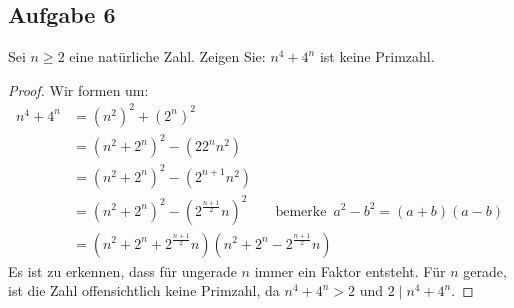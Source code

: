 \subsection{Aufgabe 6}
Sei $n \geq 2$ eine natürliche Zahl. Zeigen Sie: $n^4 + 4^n$ ist keine Primzahl.
\begin{proof}
  Wir formen um:
  \begin{equation*}
    \begin{aligned}
      n^4 + 4^n & = (n^2)^2 + (2^n)^2                                                \\
                & = (n^2 + 2^n)^2 - (22^nn^2)                                        \\
                & = (n^2 + 2^n)^2 - (2^{n+1}n^2)                                     \\
                & = (n^2 + 2^n)^2 - (2^{\frac{n+1}{2}}n)^2
      \qquad \text{bemerke} \enspace a^2 - b^2 = (a + b)(a - b)                      \\
                & = (n^2 + 2^n + 2^{\frac{n+1}{2}}n)(n^2 + 2^n - 2^{\frac{n+1}{2}}n)
    \end{aligned}
  \end{equation*}
  Es ist zu erkennen, dass für ungerade $n$ immer ein Faktor entsteht.
  Für $n$ gerade, ist die Zahl offensichtlich keine Primzahl,
  da $n^4 + 4^n > 2$ und $2 \mid n^4 + 4^n$.
\end{proof}
